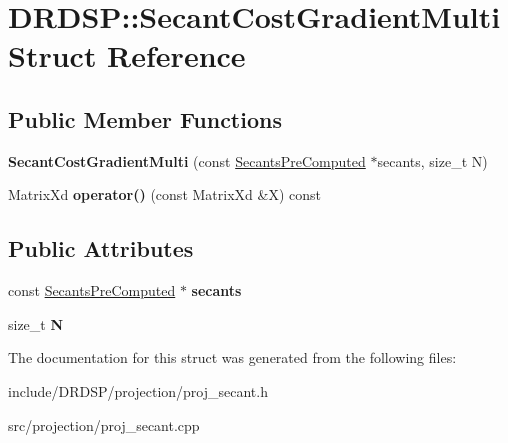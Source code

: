\hypertarget{struct_d_r_d_s_p_1_1_secant_cost_gradient_multi}{\section{D\-R\-D\-S\-P\-:\-:Secant\-Cost\-Gradient\-Multi Struct Reference}
\label{struct_d_r_d_s_p_1_1_secant_cost_gradient_multi}
}
\subsection*{Public Member Functions}
\begin{DoxyCompactItemize}
\item 
\hypertarget{struct_d_r_d_s_p_1_1_secant_cost_gradient_multi_abede4979c7526cfd535abd711bb8930e}{{\bfseries Secant\-Cost\-Gradient\-Multi} (const \hyperlink{struct_d_r_d_s_p_1_1_secants_pre_computed}{Secants\-Pre\-Computed} $\ast$secants, size\-\_\-t N)}\label{struct_d_r_d_s_p_1_1_secant_cost_gradient_multi_abede4979c7526cfd535abd711bb8930e}

\item 
\hypertarget{struct_d_r_d_s_p_1_1_secant_cost_gradient_multi_ac5d9872ad2ea3cfaa093701147eb9e59}{Matrix\-Xd {\bfseries operator()} (const Matrix\-Xd \&X) const }\label{struct_d_r_d_s_p_1_1_secant_cost_gradient_multi_ac5d9872ad2ea3cfaa093701147eb9e59}

\end{DoxyCompactItemize}
\subsection*{Public Attributes}
\begin{DoxyCompactItemize}
\item 
\hypertarget{struct_d_r_d_s_p_1_1_secant_cost_gradient_multi_aaf962e671dc7ef2079a136fdee47b193}{const \hyperlink{struct_d_r_d_s_p_1_1_secants_pre_computed}{Secants\-Pre\-Computed} $\ast$ {\bfseries secants}}\label{struct_d_r_d_s_p_1_1_secant_cost_gradient_multi_aaf962e671dc7ef2079a136fdee47b193}

\item 
\hypertarget{struct_d_r_d_s_p_1_1_secant_cost_gradient_multi_a44b55a4bb3da9af972fa093a77e83662}{size\-\_\-t {\bfseries N}}\label{struct_d_r_d_s_p_1_1_secant_cost_gradient_multi_a44b55a4bb3da9af972fa093a77e83662}

\end{DoxyCompactItemize}


The documentation for this struct was generated from the following files\-:\begin{DoxyCompactItemize}
\item 
include/\-D\-R\-D\-S\-P/projection/proj\-\_\-secant.\-h\item 
src/projection/proj\-\_\-secant.\-cpp\end{DoxyCompactItemize}
